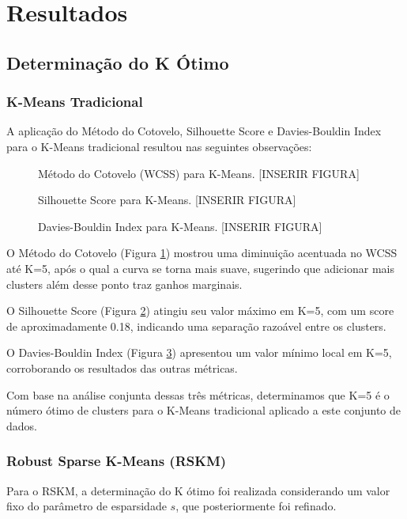 \documentclass[conference]{IEEEtran}
\begin{document}
\section{Resultados}
\subsection{Determinação do K Ótimo}
\subsubsection{K-Means Tradicional}
A aplicação do Método do Cotovelo, Silhouette Score e Davies-Bouldin Index para o K-Means tradicional resultou nas seguintes observações:

\begin{figure}[!t]
\centering
\caption{Método do Cotovelo (WCSS) para K-Means. [INSERIR FIGURA]}
\label{fig:kmeans_elbow}
\end{figure}

\begin{figure}[!t]
\centering
\caption{Silhouette Score para K-Means. [INSERIR FIGURA]}
\label{fig:kmeans_silhouette}
\end{figure}

\begin{figure}[!t]
\centering
\caption{Davies-Bouldin Index para K-Means. [INSERIR FIGURA]}
\label{fig:kmeans_dbi}
\end{figure}

O Método do Cotovelo (Figura \ref{fig:kmeans_elbow}) mostrou uma diminuição acentuada no WCSS até K=5, após o qual a curva se torna mais suave, sugerindo que adicionar mais clusters além desse ponto traz ganhos marginais.

O Silhouette Score (Figura \ref{fig:kmeans_silhouette}) atingiu seu valor máximo em K=5, com um score de aproximadamente 0.18, indicando uma separação razoável entre os clusters.

O Davies-Bouldin Index (Figura \ref{fig:kmeans_dbi}) apresentou um valor mínimo local em K=5, corroborando os resultados das outras métricas.

Com base na análise conjunta dessas três métricas, determinamos que K=5 é o número ótimo de clusters para o K-Means tradicional aplicado a este conjunto de dados.

\subsubsection{Robust Sparse K-Means (RSKM)}
Para o RSKM, a determinação do K ótimo foi realizada considerando um valor fixo do parâmetro de esparsidade $s$, que posteriormente foi refinado.
\end{document}
